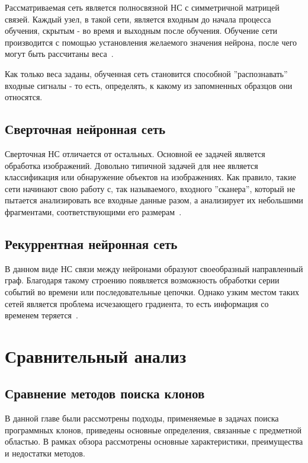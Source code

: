 Рассматриваемая сеть является полносвязной НС с симметричной матрицей связей. Каждый узел, в такой сети, является входным до начала процесса обучения, скрытым - во время и выходным после обучения. Обучение сети производится с помощью установления желаемого значения нейрона, после чего могут быть рассчитаны веса~\cite{hopfield}. 

Как только веса заданы, обученная сеть становится способной ''распознавать'' входные сигналы - то есть, определять, к какому из запомненных образцов они относятся.

\subsection{Сверточная нейронная сеть}

Сверточная НС отличается от остальных. Основной ее задачей является обработка изображений. Довольно типичной задачей для нее является классификация или обнаружение объектов на изображениях. Как правило, такие сети начинают свою работу с, так называемого, входного ''сканера'', который не пытается анализировать все входные данные разом, а анализирует их небольшими фрагментами, соответствующими его размерам~\cite{cnn}. 

\subsection{Рекуррентная нейронная сеть}

В данном виде НС связи между нейронами образуют своеобразный направленный граф. Благодаря такому строению появляется возможность обработки серии событий во времени или последовательные цепочки. Однако узким местом таких сетей является проблема исчезающего градиента, то есть информация со временем теряется~\cite{rnn}.

\section{Сравнительный анализ}

\subsection{Сравнение методов поиска клонов}

В данной главе были рассмотрены подходы, применяемые в задачах поиска программных клонов, приведены основные определения, связанные с предметной областью. В рамках обзора рассмотрены основные характеристики, преимущества и недостатки методов.

